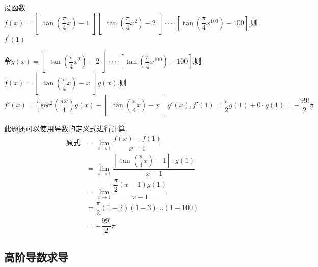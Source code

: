 \documentclass[8pt a4paper, oneside, UTF8]{ctexbook}  %
\begin{document}
\begin{sloppypar}
\begin{note}
    \end{note}
    \begin{problem}
        设函数 $f(x)=\begin{bmatrix}\tan\left(\dfrac{\pi}{4}x\right)-1\end{bmatrix}\begin{bmatrix}\tan\left(\dfrac{\pi}{4}x^{2}\right)-2\end{bmatrix}\cdotp\cdotp\cdotp\cdotp\left[\tan\left(\dfrac{\pi}{4}x^{100}\right)-100\right]$,则 $f^\prime(1)$
    \end{problem}
    \begin{solution}
        令$g(x)=\begin{bmatrix}\tan\left(\dfrac{\pi}{4}x^{2}\right)-2\end{bmatrix}\cdotp\cdotp\cdotp\cdotp\left[\tan\left(\dfrac{\pi}{4}x^{100}\right)-100\right]$,则$f(x)=\begin{bmatrix}\tan(\dfrac{\pi}{4}x)-x\end{bmatrix}g(x)$.则 $f'(x)=\dfrac\pi4\mathrm{sec}^2\left(\dfrac{\pi x}4\right)g(x)+\begin{bmatrix}\tan(\dfrac{\pi}{4}x)-x\end{bmatrix}g'(x),f'(1)=\dfrac{\pi}{2}g(1) + 0 \cdot g(1) = -\dfrac{99!}{2}\pi$
    \end{solution}
    \begin{note}
        此题还可以使用导数的定义式进行计算.
        \begin{align*}
          \text{原式} & = \lim_{x\to1}\dfrac{f(x)-f(1)}{x-1}\\
          & = \lim_{x\to1}\dfrac{[\tan(\dfrac{\pi}{4}x)-1]\cdot g(1)}{x-1}\\
          & = \lim_{x \to 1}\dfrac{\dfrac{\pi}{2}(x-1)g(1)}{x-1}\\
          & = \dfrac{\pi}{2}(1-2)(1-3)\dots(1-100)\\
          & = -\dfrac{99!}{2}\pi
        \end{align*}
    \end{note}
    \subsection{高阶导数求导}

\end{sloppypar}
\end{document}

